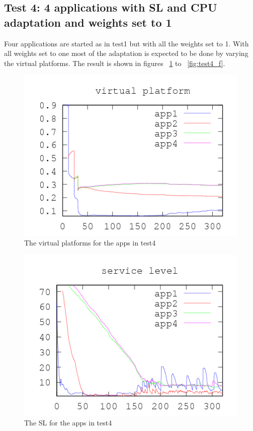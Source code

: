 \documentclass[nobiblatex]{LTHthesis}
\begin{document}
\subsection{Test 4: 4 applications with SL and CPU adaptation and weights set to 1}
Four applications are started as in test1 but with all the weights set to 1.
With all weights set to one most of the adaptation is expected to be done by varying the virtual platforms.
The result is shown in figures ~\ref{fig:test4_vp} to ~\ref{fig:test4_f}. 

\begin{figure}[!H]
  \centering
  \includegraphics{"tools/plot/logs/test4/vp"}
  \caption{The virtual platforms for the apps in test4}
  \label{fig:test4_vp}
\end{figure}

\begin{figure}[!H]
  \centering
  \includegraphics{"tools/plot/logs/test4/sl"}
  \caption{The SL for the apps in test4}
  \label{fig:test4_sl}
\end{figure}
\end{document}
